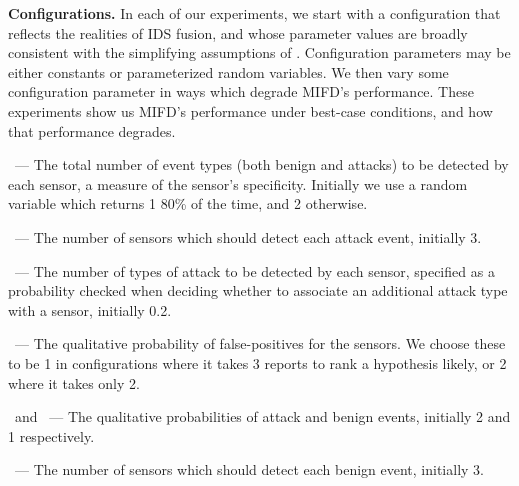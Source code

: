 \textbf{Configurations.}
\label{sec-5-1}
In each of our experiments, we start with a configuration that reflects the
realities of IDS fusion, and whose parameter values are broadly consistent with
the simplifying assumptions of \zplus.
Configuration parameters may be either constants or parameterized random
variables.
We then vary some configuration parameter in ways which degrade
MIFD's performance. These experiments show us MIFD's performance under best-case conditions, and
how that performance degrades.
\begin{compactitem}
\item \numEventProtosDetected\ --- The total number of event types (both
  benign and attacks) to be
  detected by each sensor, a measure of the sensor's specificity. 
  Initially we use a random variable which returns 1 80\%
  of the time, and 2 otherwise.
\item \sensorToAttackRatio\ --- The number of sensors which should
  detect each attack event, initially 3.
\item \sensorOverlap\ --- The number of types of attack to be detected by each
  sensor, specified as a probability checked when deciding whether to
  associate an additional attack type with a sensor, initially 0.2.
\item \fpKappa\ --- The qualitative probability of
  false-positives for the sensors. We choose these to be 1
  in configurations where it takes 3 reports to rank a hypothesis likely, or 2
  where it takes only 2.
% 
%
%
\item \attackKappa\ and \benignKappa\ --- The qualitative
  probabilities of attack and benign events, initially
  2 and 1 respectively.


\item \sensorToBenignRatio\ --- The number of sensors which should
  detect each benign event, initially 3.


\end{compactitem}
